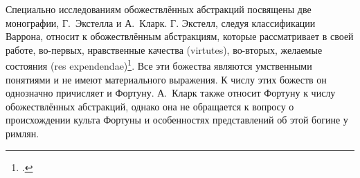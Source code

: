 Специально исследованиям обожествлённых абстракций посвящены две монографии, Г.~Экстелла и А.~Кларк. Г. Экстелл, следуя классификации Варрона, относит к обожествлённым абстракциям, которые рассматривает в своей работе, во-первых, нравственные качества (virtutes), во-вторых, желаемые состояния (res expendendae)\footcite[P. 7]{Axtell1907}. Все эти божества являются умственными понятиями и не имеют материального выражения. К числу этих божеств он однозначно причисляет и Фортуну. А.~Кларк также относит Фортуну к числу обожествлённых абстракций, однако она не обращается к вопросу о происхождении культа Фортуны и особенностях представлений об этой богине у римлян.





